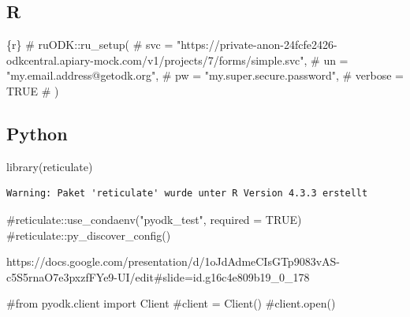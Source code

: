 \documentclass[
  letterpaper,
  DIV=11,
  numbers=noendperiod,
  oneside]{scrreprt}
\newenvironment{Shaded}{\begin{snugshade}}{\end{snugshade}}
\newcommand{\CommentTok}[1]{\textcolor[rgb]{0.37,0.37,0.37}{#1}}
\newcommand{\FunctionTok}[1]{\textcolor[rgb]{0.28,0.35,0.67}{#1}}
\newcommand{\InformationTok}[1]{\textcolor[rgb]{0.37,0.37,0.37}{#1}}
\newcommand{\NormalTok}[1]{\textcolor[rgb]{0.00,0.23,0.31}{#1}}
\begin{document}
\subsection{R}

\begin{Shaded}
\begin{Highlighting}[]
\InformationTok{\textasciigrave{}\textasciigrave{}\textasciigrave{}\{r\}}
\CommentTok{\# ruODK::ru\_setup(}
\CommentTok{\#   svc = "https://private{-}anon{-}24fcfe2426{-}odkcentral.apiary{-}mock.com/v1/projects/7/forms/simple.svc",}
\CommentTok{\#   un = "my.email.address@getodk.org",}
\CommentTok{\#   pw = "my.super.secure.password",}
\CommentTok{\#   verbose = TRUE}
\CommentTok{\# )}
\InformationTok{\textasciigrave{}\textasciigrave{}\textasciigrave{}}
\end{Highlighting}
\end{Shaded}

\subsection{Python}

\begin{Shaded}
\begin{Highlighting}[]
\FunctionTok{library}\NormalTok{(reticulate)}
\end{Highlighting}
\end{Shaded}

\begin{verbatim}
Warning: Paket 'reticulate' wurde unter R Version 4.3.3 erstellt
\end{verbatim}

\begin{Shaded}
\begin{Highlighting}[]
\CommentTok{\#reticulate::use\_condaenv("pyodk\_test", required = TRUE)}
\CommentTok{\#reticulate::py\_discover\_config()}
\end{Highlighting}
\end{Shaded}

https://docs.google.com/presentation/d/1oJdAdmeCIsGTp9083vAS-c5S5rnaO7e3pxzfFYe9-UI/edit\#slide=id.g16c4e809b19\_0\_178

\begin{Shaded}
\begin{Highlighting}[]
\CommentTok{\#from pyodk.client import Client}
\CommentTok{\#client = Client()}
\CommentTok{\#client.open()}
\end{Highlighting}
\end{Shaded}
\end{document}
